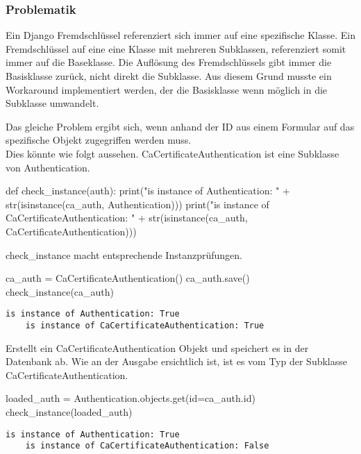 \subsubsection{Problematik}
Ein Django Fremdschlüssel referenziert sich immer auf eine spezifische Klasse. Ein Fremdschlüssel auf eine eine Klasse mit mehreren Subklassen, referenziert somit immer auf die Baseklasse. Die Auflösung des Fremdschlüssels gibt immer die Basisklasse zurück, nicht direkt die Subklasse. Aus diesem Grund musste ein Workaround implementiert werden, der die Basisklasse wenn möglich in die Subklasse umwandelt.

Das gleiche Problem ergibt sich, wenn anhand der ID aus einem Formular auf das spezifische Objekt zugegriffen werden muss.
\\
Dies könnte wie folgt aussehen. CaCertificateAuthentication ist eine Subklasse von Authentication.
\medskip
\begin{python}
    def check_instance(auth):
        print("is instance of Authentication: " + 
            str(isinstance(ca_auth, Authentication)))
        print("is instance of CaCertificateAuthentication: " + 
            str(isinstance(ca_auth, CaCertificateAuthentication)))
\end{python}
check\_instance macht entsprechende Instanzprüfungen.\\

\begin{python}
    ca_auth = CaCertificateAuthentication()
    ca_auth.save()
    check_instance(ca_auth)
\end{python}

\begin{lstlisting}[style=BashInputStyle]
    is instance of Authentication: True
    is instance of CaCertificateAuthentication: True
\end{lstlisting}    
Erstellt ein  CaCertificateAuthentication Objekt und speichert es in der Datenbank ab. Wie an der Ausgabe ersichtlich ist, ist es vom Typ der Subklasse CaCertificateAuthentication.\\

\begin{python}
    loaded_auth = Authentication.objects.get(id=ca_auth.id)
    check_instance(loaded_auth)
\end{python}
\begin{lstlisting}[style=BashInputStyle]
    is instance of Authentication: True
    is instance of CaCertificateAuthentication: False
\end{lstlisting} 

